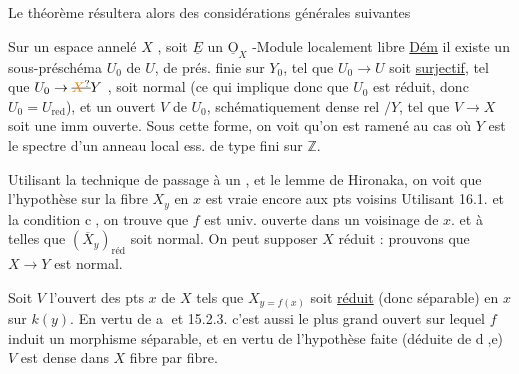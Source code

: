 Le théorème résultera alors des considérations générales suivantes \handwritten{\unsure{;|:}}

Sur un espace  annelé $X$ , soit $\underline E$ un $\underline{\mathrm O}_X$ -Module localement libre
\uline{Dém}  il existe
un sous-préschéma $U_0$  de $U$, de prés. finie sur $Y_0$,
tel que $U_0\to U$ soit \uline{surjectif},  tel que
$U_0\to\deleted{\unsure{X}}Y$ , soit  normal 
(ce qui implique donc que $U_0$ est réduit, donc $U_0=U_{\text{red}}$), et un ouvert
$V$ de $U_0$, schématiquement dense rel $/Y$, tel que
$V\longrightarrow X$ soit une imm ouverte. Sous cette
forme, on voit qu'on est ramené au cas
où $Y$ est le spectre d'un anneau local ess.
de type fini sur $\mathbb Z$.

Utilisant la technique  de passage à un ,
et le lemme de Hironaka, on voit que l'hypothèse sur la fibre $X_y$ en $x$ est vraie encore aux
pts voisins  Utilisant  16.1.  et la 
condition \textcircled{c}, on trouve que $f$ est univ. ouverte  dans
un voisinage de $x$. 
et à  telles que $(\overline X_y)_{\text{réd}}$ soit normal.  On
 peut supposer $X$ réduit : prouvons que
$X\to Y$ est normal.

Soit $V$ l'ouvert des pts $x$ de $X$ tels que $X_{y=f(x)}$ soit
\uline{réduit} (donc séparable) en $x$ sur $k(y)$. En vertu de \textcircled{a} et
 15.2.3. c'est aussi le plus grand ouvert sur lequel
$f$ induit un morphisme  séparable, et en
vertu de l'hypothèse faite (déduite de \textcircled{d,e}) $V$ est
dense dans $X$ fibre par fibre. 

